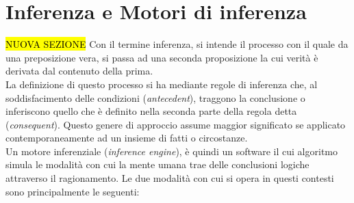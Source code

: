 \section{Inferenza e Motori di inferenza}
\hl{NUOVA SEZIONE}
 \label{App:AppendiceInference}
 Con  il termine inferenza, si intende il processo con il quale da una preposizione vera, si passa ad una seconda proposizione la cui verità è derivata dal contenuto della prima. \\
 La definizione di questo processo si ha mediante regole di inferenza che, al soddisfacimento delle condizioni (\textit{antecedent}), traggono la conclusione o inferiscono quello che è definito nella seconda parte della regola detta (\textit{consequent}).
 Questo genere di approccio assume maggior significato se applicato contemporaneamente ad un insieme di fatti o circostanze. \\
 Un motore inferenziale (\textit{inference engine}), è quindi un software il cui algoritmo simula le modalità con cui la mente umana trae delle conclusioni logiche attraverso il ragionamento.
 Le due modalità con cui si opera in questi contesti sono principalmente le seguenti:

